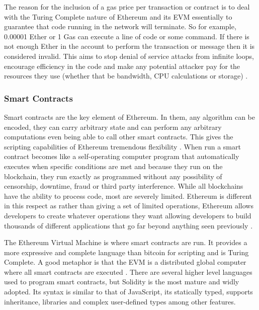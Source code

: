 \documentclass{article}
\begin{document}
The reason for the inclusion of a gas price per transaction or contract is to deal with the Turing Complete nature of Ethereum and its EVM essentially to guarantee that code running in the network will terminate. So for example, 0.00001 Ether or 1 Gas can execute a line of code or some command. If there is not enough Ether in the account to perform the transaction or message then it is considered invalid. This aims to stop denial of service attacks from infinite loops, encourage efficiency in the code and make any potential attacker pay for the resources they use (whether that be bandwidth, CPU calculations or storage) \citep{56_ethereum_2017}.

\subsubsection{Smart Contracts}
\label{sec:SmartContracts}
Smart contracts are the key element of Ethereum. In them, any algorithm can be encoded, they can carry arbitrary state and can perform any arbitrary computations even being able to call other smart contracts. This gives the scripting capabilities of Ethereum tremendous flexibility \citep{59_peyrott_senanayaka_2017}. When run a smart contract becomes like a self-operating computer program that automatically executes when specific conditions are met and because they run on the blockchain, they run exactly as programmed without any possibility of censorship, downtime, fraud or third party interference. While all blockchains have the ability to process code, most are severely limited. Ethereum is different in this respect as rather than giving a set of limited operations, Ethereum allows developers to create whatever operations they want allowing developers to build thousands of different applications that go far beyond anything seen previously \citep{55_what_is_ethereum_a_step-by-step_beginners_guide_2017}.

The Ethereum Virtual Machine is where smart contracts are run. It provides a more expressive and complete language than bitcoin for scripting and is Turing Complete. A good metaphor is that the EVM is a distributed global computer where all smart contracts are executed \citep{58_the_hitchhikers_guide_to_smart_contracts_in_ethereum_2017}. There are several higher level languages used to program smart contracts, but Solidity is the most mature and widly adopted. Its syntax is similar to that of JavaScript, its statically typed, supports inheritance, libraries and complex user-defined types among other features.
\end{document}
